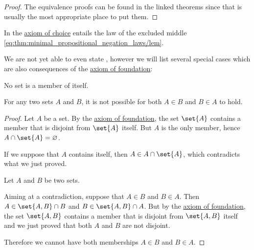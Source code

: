 \begin{proof}
  The equivalence proofs can be found in the linked theorems since that is usually the most appropriate place to put them.
\end{proof}

\begin{theorem}\label{thm:diaconescu_goodman_myhill_theorem}
  In \hyperref[def:zfc]{} the \hyperref[def:zfc/choice]{axiom of choice} entails the law of the excluded middle \eqref{eq:thm:minimal_propositional_negation_laws/lem}.
\end{theorem}

\begin{proposition}\label{thm:simple_foundation_theorems}
  We are not yet able to even state , however we will list several special cases which are also consequences of the \hyperref[def:zfc/foundation]{axiom of foundation}:

  \begin{thmenum}
     No set is a member of itself.

     For any two sets \( A \) and \( B \), it is not possible for both \( A \in B \) and \( B \in A \) to hold.
  \end{thmenum}
\end{proposition}
\begin{proof}
   Let \( A \) be a set. By the \hyperref[def:zfc/foundation]{axiom of foundation}, the set \( \set{ A } \) contains a member that is disjoint from \( \set{ A } \) itself. But \( A \) is the only member, hence \( A \cap \set{ A } = \varnothing \).

  If we suppose that \( A \) contains itself, then \( A \in A \cap \set{ A } \), which contradicts what we just proved.

   Let \( A \) and \( B \) be two sets.

  Aiming at a contradiction, suppose that \( A \in B \) and \( B \in A \). Then \( A \in \set{ A, B } \cap B \) and \( B \in \set{ A, B } \cap A \). But by the \hyperref[def:zfc/foundation]{axiom of foundation}, the set \( \set{ A, B } \) contains a member that is disjoint from \( \set{ A, B } \) itself and we just proved that both \( A \) and \( B \) are not disjoint.

  Therefore we cannot have both memberships \( A \in B \) and \( B \in A \).
\end{proof}

